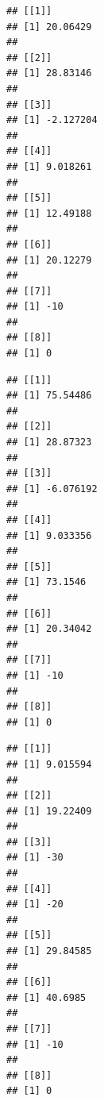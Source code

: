 \documentclass[
]{article}
\newenvironment{Shaded}{\begin{snugshade}}{\end{snugshade}}
\newcommand{\ControlFlowTok}[1]{\textcolor[rgb]{0.13,0.29,0.53}{\textbf{#1}}}
\newcommand{\FunctionTok}[1]{\textcolor[rgb]{0.00,0.00,0.00}{#1}}
\newcommand{\NormalTok}[1]{#1}
\newcommand{\SpecialCharTok}[1]{\textcolor[rgb]{0.00,0.00,0.00}{#1}}
\newcommand{\StringTok}[1]{\textcolor[rgb]{0.31,0.60,0.02}{#1}}
\begin{document}
\begin{verbatim}
## [[1]]
## [1] 20.06429
## 
## [[2]]
## [1] 28.83146
## 
## [[3]]
## [1] -2.127204
## 
## [[4]]
## [1] 9.018261
## 
## [[5]]
## [1] 12.49188
## 
## [[6]]
## [1] 20.12279
## 
## [[7]]
## [1] -10
## 
## [[8]]
## [1] 0
\end{verbatim}

\begin{Shaded}
\end{Shaded}

\begin{verbatim}
## [[1]]
## [1] 75.54486
## 
## [[2]]
## [1] 28.87323
## 
## [[3]]
## [1] -6.076192
## 
## [[4]]
## [1] 9.033356
## 
## [[5]]
## [1] 73.1546
## 
## [[6]]
## [1] 20.34042
## 
## [[7]]
## [1] -10
## 
## [[8]]
## [1] 0
\end{verbatim}

\begin{Shaded}
\end{Shaded}

\begin{verbatim}
## [[1]]
## [1] 9.015594
## 
## [[2]]
## [1] 19.22409
## 
## [[3]]
## [1] -30
## 
## [[4]]
## [1] -20
## 
## [[5]]
## [1] 29.84585
## 
## [[6]]
## [1] 40.6985
## 
## [[7]]
## [1] -10
## 
## [[8]]
## [1] 0
\end{verbatim}

\begin{Shaded}
\end{Shaded}
\end{document}
